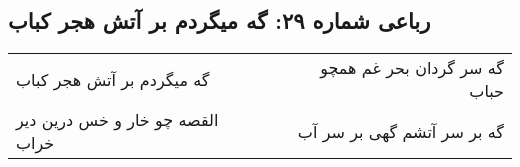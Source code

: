 \begin{center}
\section*{رباعی شماره ۲۹: گه میگردم بر آتش هجر کباب}
\label{sec:sh029}
\begin{longtable}{l p{0.5cm} r}
گه میگردم بر آتش هجر کباب
&&
گه سر گردان بحر غم همچو حباب
\\
القصه چو خار و خس درین دیر خراب
&&
گه بر سر آتشم گهی بر سر آب
\\
\end{longtable}
\end{center}
